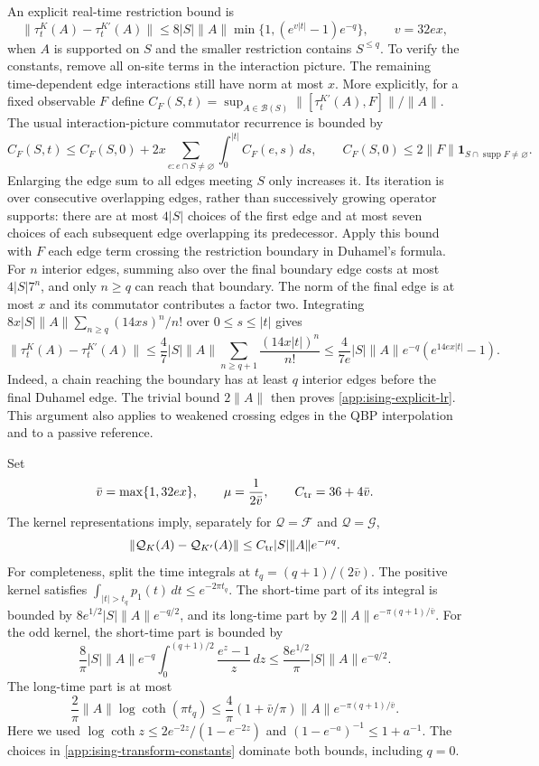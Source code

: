 \documentclass[11pt,a4paper]{article}
\theoremstyle{remark}
\DeclareMathOperator{\supp}{supp}
\begin{document}
An explicit real-time restriction bound is
\begin{equation}
 \|\tau_t^K(A)-\tau_t^{K'}(A)\|
 \le8|S|\|A\|\min\{1,(e^{v|t|}-1)e^{-q}\},
 \qquad v=32e x,
 \label{app:ising-explicit-lr}
\end{equation}
when $A$ is supported on $S$ and the smaller restriction contains
$S^{\le q}$. To verify the constants, remove all on-site terms in the
interaction picture. The remaining time-dependent edge interactions
still have norm at most $x$. More explicitly, for a fixed observable
$F$ define $C_F(S,t)=\sup_{A\in\mathcal B(S)}
\|[\tau_t^{K'}(A),F]\|/\|A\|$. The usual interaction-picture
commutator recurrence is bounded by
\[
 C_F(S,t)\le C_F(S,0)
       +2x\sum_{e:e\cap S\ne\varnothing}
              \int_0^{|t|}C_F(e,s)\,ds,
 \qquad
 C_F(S,0)\le2\|F\|\mathbf1_{S\cap\supp F\ne\varnothing}.
\]
Enlarging the edge sum to all edges meeting $S$ only increases it.
Its iteration is over consecutive overlapping edges, rather than
successively growing operator supports: there are at most $4|S|$
choices of the first edge and at most seven choices of each subsequent
edge overlapping its predecessor. Apply this bound with $F$ each
edge term crossing the restriction boundary in Duhamel's formula.
For $n$ interior edges, summing also over the final boundary edge
costs at most $4|S|7^n$, and only $n\ge q$ can reach that boundary.
The norm of the final edge is at most $x$ and its commutator contributes
a factor two. Integrating
$8x|S|\|A\|\sum_{n\ge q}(14xs)^n/n!$ over $0\le s\le|t|$ gives
\[
 \|\tau_t^K(A)-\tau_t^{K'}(A)\|
 \le\frac47 |S|\|A\|
       \sum_{n\ge q+1}\frac{(14x|t|)^n}{n!}
 \le\frac4{7e}|S|\|A\|e^{-q}(e^{14e x|t|}-1).
\]
Indeed, a chain reaching the boundary has at least $q$ interior edges
before the final Duhamel edge. The trivial bound $2\|A\|$ then proves
\eqref{app:ising-explicit-lr}. This argument also applies to weakened
crossing edges in the QBP interpolation and to a passive reference.

Set
\begin{equation}
 \bar v=\max\{1,32ex\},\qquad
 \mu=\frac1{2\bar v},\qquad C_{\rm tr}=36+4\bar v.
 \label{app:ising-transform-constants}
\end{equation}
The kernel representations imply, separately for
$\mathcal Q=\mathcal F$ and $\mathcal Q=\mathcal G$,
\begin{equation}
 \|\mathcal Q_K(A)-\mathcal Q_{K'}(A)\|
 \le C_{\rm tr}|S|\|A\|e^{-\mu q}.
 \label{app:ising-transform-bound}
\end{equation}
For completeness, split the time integrals at
$t_q=(q+1)/(2\bar v)$. The positive kernel satisfies
$\int_{|t|>t_q}p_1(t)\,dt\le e^{-2\pi t_q}$.
The short-time part of its integral is bounded by
$8e^{1/2}|S|\|A\|e^{-q/2}$, and its long-time part by
$2\|A\|e^{-\pi(q+1)/\bar v}$.
For the odd kernel, the short-time part is bounded by
\[
 \frac8\pi|S|\|A\|e^{-q}
 \int_0^{(q+1)/2}\frac{e^z-1}{z}\,dz
 \le\frac{8e^{1/2}}\pi|S|\|A\|e^{-q/2}.
\]
The long-time part is at most
\[
 \frac2\pi\|A\|\log\coth(\pi t_q)
 \le\frac4\pi(1+\bar v/\pi)\|A\|
          e^{-\pi(q+1)/\bar v}.
\]
Here we used $\log\coth z\le2e^{-2z}/(1-e^{-2z})$ and
$(1-e^{-a})^{-1}\le1+a^{-1}$. The choices in
\eqref{app:ising-transform-constants} dominate both bounds, including
$q=0$.
\end{document}
